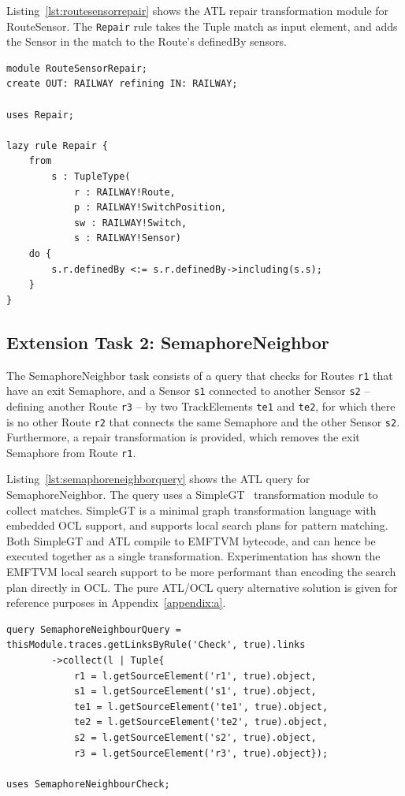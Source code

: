 \documentclass[submission,copyright,creativecommons]{eptcs}
\begin{document}
Listing~\ref{lst:routesensorrepair} shows the ATL repair transformation module for RouteSensor. The \texttt{Repair} rule takes the Tuple match as input element, and adds the Sensor in the match to the Route's definedBy sensors.

\lstset{language=atl}
\begin{lstlisting}[float=htb, caption={RouteSensor repair transformation module in ATL}, label=lst:routesensorrepair, captionpos=b, frame=tb, belowskip=-10pt]
module RouteSensorRepair;
create OUT: RAILWAY refining IN: RAILWAY;

uses Repair;

lazy rule Repair {
	from
		s : TupleType(
			r : RAILWAY!Route, 
			p : RAILWAY!SwitchPosition, 
			sw : RAILWAY!Switch,
			s : RAILWAY!Sensor)
	do {
		s.r.definedBy <:= s.r.definedBy->including(s.s);
	}
}
\end{lstlisting}

\subsection{Extension Task 2: SemaphoreNeighbor}

The SemaphoreNeighbor task consists of a query that checks for Routes \texttt{r1} that have an exit Semaphore, and a Sensor \texttt{s1} connected to another Sensor \texttt{s2} -- defining another Route \texttt{r3} -- by two TrackElements \texttt{te1} and \texttt{te2}, for which there is no other Route \texttt{r2} that connects the same Semaphore and the other Sensor \texttt{s2}. Furthermore, a repair transformation is provided, which removes the exit Semaphore from Route \texttt{r1}.

Listing~\ref{lst:semaphoreneighborquery} shows the ATL query for SemaphoreNeighbor. The query uses a SimpleGT~\cite{conf/models/Wagelaar2011} transformation module to collect matches. SimpleGT is a minimal graph transformation language with embedded OCL support, and supports local search plans for pattern matching. Both SimpleGT and ATL compile to EMFTVM bytecode, and can hence be executed together as a single transformation. Experimentation has shown the EMFTVM local search support to be more performant than encoding the search plan directly in OCL. The pure ATL/OCL query alternative solution is given for reference purposes in Appendix~\ref{appendix:a}.

\lstset{language=atl}
\begin{lstlisting}[float=htb, caption={SemaphoreNeighborQuery in ATL}, label=lst:semaphoreneighborquery, captionpos=b, frame=tb, belowskip=-10pt]
query SemaphoreNeighbourQuery = thisModule.traces.getLinksByRule('Check', true).links
		->collect(l | Tuple{
			r1 = l.getSourceElement('r1', true).object,
			s1 = l.getSourceElement('s1', true).object,
			te1 = l.getSourceElement('te1', true).object,
			te2 = l.getSourceElement('te2', true).object,
			s2 = l.getSourceElement('s2', true).object,
			r3 = l.getSourceElement('r3', true).object});

uses SemaphoreNeighbourCheck;
\end{lstlisting}
\end{document}
